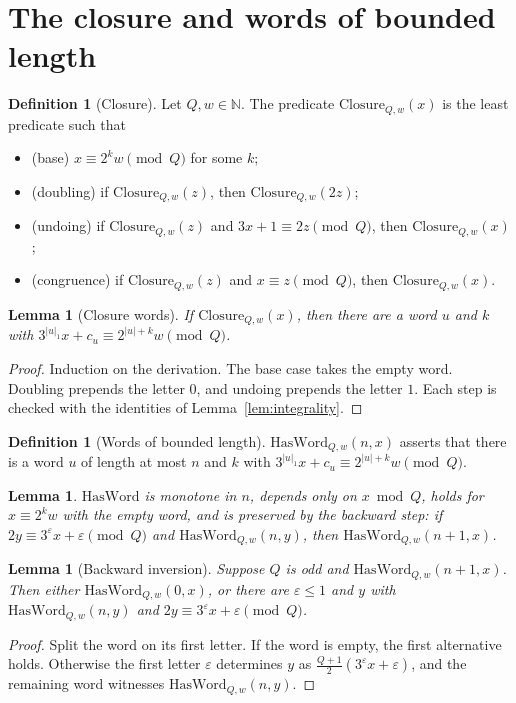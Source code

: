 \documentclass[11pt,reqno,oneside]{amsart}
\theoremstyle{plain}
\newtheorem{lemma}[theorem]{Lemma}
\theoremstyle{definition}
\newtheorem{definition}[theorem]{Definition}
\numberwithin{equation}{section}
\begin{document}
\section{The closure and words of bounded length}\label{sec:closure}

\begin{definition}[Closure]\label{def:closure}
Let $Q,w\in\mathbb N$. The predicate $\mathrm{Closure}_{Q,w}(x)$ is the least predicate such that
\begin{itemize}[leftmargin=2em]
\item (base) $x\equiv2^kw\pmod Q$ for some $k$;
\item (doubling) if $\mathrm{Closure}_{Q,w}(z)$, then $\mathrm{Closure}_{Q,w}(2z)$;
\item (undoing) if $\mathrm{Closure}_{Q,w}(z)$ and $3x+1\equiv2z\pmod Q$, then $\mathrm{Closure}_{Q,w}(x)$;
\item (congruence) if $\mathrm{Closure}_{Q,w}(z)$ and $x\equiv z\pmod Q$, then $\mathrm{Closure}_{Q,w}(x)$.
\end{itemize}
\end{definition}

\begin{lemma}[Closure words]\label{lem:closureword}
If $\mathrm{Closure}_{Q,w}(x)$, then there are a word $u$ and $k$ with $3^{|u|_1}x+c_u\equiv2^{|u|+k}w\pmod Q$.
\end{lemma}
\begin{proof}
Induction on the derivation. The base case takes the empty word. Doubling prepends the letter $0$, and undoing prepends the letter $1$. Each step is checked with the identities of Lemma~\ref{lem:integrality}.
\end{proof}

\begin{definition}[Words of bounded length]\label{def:hasword}
$\mathrm{HasWord}_{Q,w}(n,x)$ asserts that there is a word $u$ of length at most $n$ and $k$ with $3^{|u|_1}x+c_u\equiv2^{|u|+k}w\pmod Q$.
\end{definition}

\begin{lemma}\label{lem:hasword}
$\mathrm{HasWord}$ is monotone in $n$, depends only on $x\bmod Q$, holds for $x\equiv2^kw$ with the empty word, and is preserved by the backward step: if $2y\equiv3^\varepsilon x+\varepsilon\pmod Q$ and $\mathrm{HasWord}_{Q,w}(n,y)$, then $\mathrm{HasWord}_{Q,w}(n+1,x)$.
\end{lemma}

\begin{lemma}[Backward inversion]\label{lem:hasinv}
Suppose $Q$ is odd and $\mathrm{HasWord}_{Q,w}(n+1,x)$. Then either $\mathrm{HasWord}_{Q,w}(0,x)$, or there are $\varepsilon\le1$ and $y$ with $\mathrm{HasWord}_{Q,w}(n,y)$ and $2y\equiv3^\varepsilon x+\varepsilon\pmod Q$.
\end{lemma}
\begin{proof}
Split the word on its first letter. If the word is empty, the first alternative holds. Otherwise the first letter $\varepsilon$ determines $y$ as $\tfrac{Q+1}{2}(3^\varepsilon x+\varepsilon)$, and the remaining word witnesses $\mathrm{HasWord}_{Q,w}(n,y)$.
\end{proof}
\end{document}
